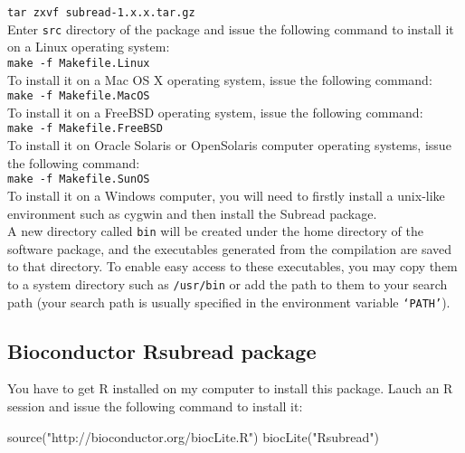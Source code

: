 \documentclass[12pt]{report}
\newcommand{\code}[1]{{\small\texttt{#1}}}
\newcommand{\Subread}{\textsf{Subread}}
\newcommand{\Rsubread}{\textsf{Rsubread}}
\newcommand{\R}{\textsf{R}}
\begin{document}
\code{tar zxvf subread-1.x.x.tar.gz}\\

Enter \code{src} directory of the package and issue the following command to install it on a Linux operating system: \\

\code{make -f Makefile.Linux}\\

To install it on a Mac OS X operating system, issue the following command:\\

\code{make -f Makefile.MacOS}\\

To install it on a FreeBSD operating system, issue the following command:\\

\code{make -f Makefile.FreeBSD}\\

To install it on Oracle Solaris or OpenSolaris computer operating systems, issue the following command:\\

\code{make -f Makefile.SunOS}\\

To install it on a Windows computer, you will need to firstly install a unix-like environment such as cygwin and then install the {\Subread} package.\\

A new directory called \code{bin} will be created under the home directory of the software package, and the executables generated from the compilation are saved to that directory.
To enable easy access to these executables, you may copy them to a system directory such as \code{/usr/bin} or add the path to them to your search path (your search path is usually specified in the environment variable \code{`PATH'}).


\subsection{Bioconductor {\Rsubread} package}

You have to get {\R} installed on my computer to install this package.
Lauch an {\R} session and issue the following command to install it:

\begin{Rcode}
source("http://bioconductor.org/biocLite.R")
biocLite("Rsubread")
\end{Rcode}
\end{document}
